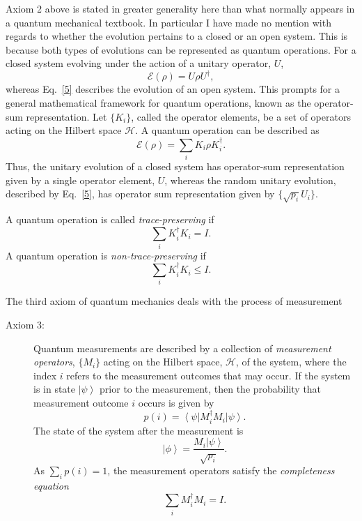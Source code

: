 \documentclass{article}
\newcommand{\ket}[1]{\left|#1\right\rangle}
\newcommand{\bra}[1]{\left\langle #1\right|}
\newcommand\defn[1]{\textsl{#1}}
\newcommand\cH{{\mathscr{H}}}
\newcommand\cE{{\mathcal E}}
\begin{document}
Axiom 2 above is stated in greater generality here than what normally appears in
a quantum mechanical textbook.  In particular I have
made no mention with regards to whether the evolution pertains to a closed or an
open system.  This is because both types of evolutions can be represented as quantum operations.  For a closed system evolving under the action of a unitary operator, $U$,   
\begin{equation}
\cE(\rho)=U\rho U^{\dagger},
\label{7}
\end{equation}
whereas Eq.~\eqref{5} describes the evolution of an open system.  This prompts for a general mathematical framework for quantum operations, known as the operator-sum representation.  Let $\{K_i\}$, 
called the operator elements,  be a set of operators acting on the Hilbert space
$\cH$.  A quantum operation can be described as
\begin{equation}
\cE(\rho)=\sum_i K_i\rho K_i^{\dagger}.
\label{8}
\end{equation}
Thus, the unitary evolution of a closed system has operator-sum representation
given by a single  operator element, $U$, whereas 
the random unitary evolution, described by Eq.~\eqref{5}, has operator sum representation given by
$\{\sqrt{p_i}U_i\}$.  

A quantum operation is called \defn{trace-preserving} if
\begin{equation}
\sum_i K_i^{\dagger}K_i=I.
\label{9}
\end{equation}
A quantum operation is \defn{non-trace-preserving} if
\begin{equation}
\sum_i K_i^{\dagger}K_i\leq I.
\label{10}
\end{equation}

The third axiom of quantum mechanics deals with the process of measurement
\begin{description}
\item[Axiom 3:]  Quantum measurements are described by a collection of \defn{measurement operators}, $\{M_i\}$ acting on the Hilbert space, $\cH$, of the system, where the index $i$ refers to the measurement outcomes that may occur.  If the system is in state $\ket{\psi}$ prior to the measurement, then the probability that measurement outcome $i$ occurs is given by 
\begin{equation}
p(i)=\bra{\psi}M_i^\dagger M_i\ket{\psi}.
\label{11}
\end{equation} 
The state of the system after the measurement is 
\begin{equation}
\ket{\phi}=\frac{M_i\ket{\psi}}{\sqrt{p_i}}.
\label{12}
\end{equation}
As $\sum_i p(i)=1$, the measurement operators satisfy the \defn{completeness equation}
\begin{equation}
\sum_i M_i^\dagger M_i=I.
\label{13}
\end{equation}
\end{description}
\end{document}
